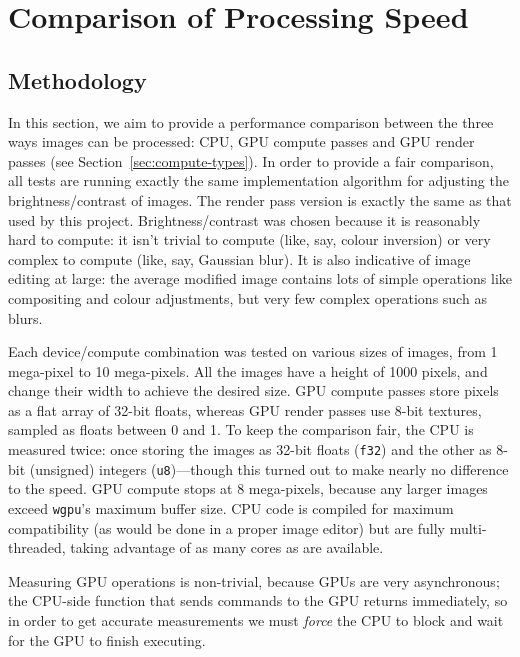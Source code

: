 \documentclass[12pt]{article}
\begin{document}
\pagebreak

\section{Comparison of Processing Speed}\label{sec:measurements}

\subsection{Methodology}

In this section, we aim to provide a performance comparison between the three ways images can be
processed: CPU, GPU compute passes and GPU render passes (see Section~\ref{sec:compute-types}).  In
order to provide a fair comparison, all tests are running exactly the same implementation algorithm
for adjusting the brightness/contrast of images.  The render pass version is exactly the same as
that used by this project.  Brightness/contrast was chosen because it is reasonably hard to compute:
it isn't trivial to compute (like, say, colour inversion) or very complex to compute (like, say,
Gaussian blur).  It is also indicative of image editing at large: the average modified image
contains lots of simple operations like compositing and colour adjustments, but very few complex
operations such as blurs.

Each device/compute combination was tested on various sizes of images, from 1 mega-pixel to 10
mega-pixels.  All the images have a height of 1000 pixels, and change their width to achieve the
desired size.  GPU compute passes store pixels as a flat array of 32-bit floats, whereas GPU render
passes use 8-bit textures, sampled as floats between 0 and 1.  To keep the comparison fair, the CPU
is measured twice: once storing the images as 32-bit floats (\verb|f32|) and the other as 8-bit
(unsigned) integers (\verb|u8|)---though this turned out to make nearly no difference to the speed.
GPU compute stops at 8 mega-pixels, because any larger images exceed \verb|wgpu|'s maximum buffer
size.  CPU code is compiled for maximum compatibility (as would be done in a proper image editor)
but are fully multi-threaded, taking advantage of as many cores as are available.

Measuring GPU operations is non-trivial, because GPUs are very asynchronous; the CPU-side function
that sends commands to the GPU returns immediately, so in order to get accurate measurements we must
\emph{force} the CPU to block and wait for the GPU to finish executing.
\end{document}
